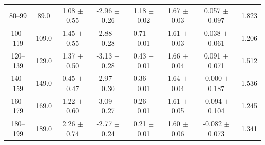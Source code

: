 \begin{table}[htbp]
\begin{tabular}{c c c c c c c c}
80--99 & 89.0 & 1.08 $\pm$ 0.55 & -2.96 $\pm$ 0.26 & 1.18 $\pm$ 0.02 & 1.67 $\pm$ 0.03 & 0.057 $\pm$ 0.097 & 1.823 \\
100--119 & 109.0 & 1.45 $\pm$ 0.55 & -2.88 $\pm$ 0.28 & 0.71 $\pm$ 0.01 & 1.61 $\pm$ 0.03 & 0.038 $\pm$ 0.061 & 1.206 \\
120--139 & 129.0 & 1.37 $\pm$ 0.50 & -3.13 $\pm$ 0.28 & 0.43 $\pm$ 0.01 & 1.66 $\pm$ 0.04 & 0.091 $\pm$ 0.071 & 1.512 \\
140--159 & 149.0 & 0.45 $\pm$ 0.47 & -2.97 $\pm$ 0.30 & 0.36 $\pm$ 0.01 & 1.64 $\pm$ 0.04 & -0.000 $\pm$ 0.187 & 1.536 \\
160--179 & 169.0 & 1.22 $\pm$ 0.60 & -3.09 $\pm$ 0.27 & 0.26 $\pm$ 0.01 & 1.61 $\pm$ 0.05 & -0.094 $\pm$ 0.104 & 1.245 \\
180--199 & 189.0 & 2.26 $\pm$ 0.74 & -2.77 $\pm$ 0.24 & 0.21 $\pm$ 0.01 & 1.60 $\pm$ 0.06 & -0.082 $\pm$ 0.073 & 1.341 \\
\hline\hline
\end{tabular}
\end{table}